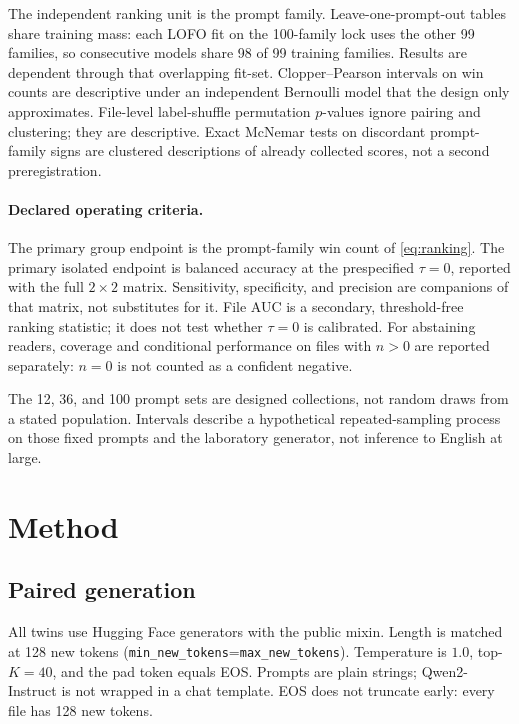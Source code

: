 \documentclass[11pt,a4paper]{article}
\theoremstyle{definition}
\newcommand{\Ktop}{K}
\begin{document}
The independent ranking unit is the prompt family. Leave-one-prompt-out
tables share training mass: each LOFO fit on the 100-family lock uses
the other 99 families, so consecutive models share 98 of 99 training
families. Results are dependent through that overlapping fit-set.
Clopper--Pearson intervals \citep{clopper1934binomial} on win counts
are descriptive under an independent Bernoulli model that the design
only approximates. File-level label-shuffle permutation $p$-values
\citep{ernst2004permutation} ignore pairing and clustering; they are
descriptive. Exact McNemar tests on discordant prompt-family signs
\citep{mcnemar1947sampling} are clustered descriptions of already
collected scores, not a second preregistration.

\paragraph{Declared operating criteria.}
The primary group endpoint is the prompt-family win count of
\eqref{eq:ranking}. The primary isolated endpoint is balanced accuracy
at the prespecified $\tau=0$, reported with the full $2\times 2$
matrix. Sensitivity, specificity, and precision are companions of that
matrix, not substitutes for it. File AUC \citep{fawcett2006roc} is a
secondary, threshold-free ranking statistic; it does not test whether
$\tau=0$ is calibrated. For abstaining readers, coverage and
conditional performance on files with $n>0$ are reported separately:
$n=0$ is not counted as a confident negative.

The 12, 36, and 100 prompt sets are designed collections, not random
draws from a stated population. Intervals describe a hypothetical
repeated-sampling process on those fixed prompts and the laboratory
generator, not inference to English at large.

\section{Method}
\label{sec:method}

\subsection{Paired generation}
\label{sec:generation}

All twins use Hugging Face generators with the public mixin.
Length is matched at 128 new tokens
(\texttt{min\_new\_tokens}=\texttt{max\_new\_tokens}). Temperature is $1.0$, top-$\Ktop=40$,
and the pad token equals EOS. Prompts are plain strings; Qwen2-Instruct
is not wrapped in a chat template. EOS does not truncate early: every
file has 128 new tokens.
\end{document}
